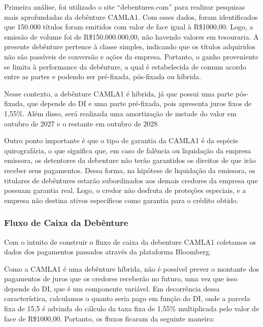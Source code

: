 \documentclass[a4paper,12pt]{article}[abntex2]
\newcommand{\real}[1]{R\$#1}
\begin{document}
Primeira análise, foi utilizado o site “debentures.com”  para realizar pesquisas mais aprofundadas da debênture CAMLA1. Com esses dados, foram identificados que 150.000 títulos foram emitidos com valor de face igual à \real{1000,00}. Logo, a emissão de volume foi de \real{150.000.000,00}, não havendo valores em tesouraria. A presente debênture pertence à classe simples, indicando que os títulos adquiridos não são passíveis de conversão e ações da empresa. Portanto, o ganho proveniente se limita à performance da debênture, a qual é estabelecida de comum acordo entre as partes e podendo ser pré-fixada, pós-fixada ou híbrida.

Nesse contexto, a debênture CAMLA1 é híbrida, já que possui uma parte pós-fixada, que depende do DI e uma parte pré-fixada, pois apresenta juros fixos de 1,55\%. Além disso, será realizada uma amortização de metade do valor em outubro de 2027 e o restante em outubro de 2028.

Outro ponto importante é que o tipo de garantia da CAMLA1 é da espécie quirografária, o que significa que, em caso de falência ou liquidação da empresa emissora, os detentores da debenture não terão garantidos os direitos de que irão receber seus pagamentos. Dessa forma, na hipótese de liquidação da emissora, os titulares de debêntures estarão subordinados aos demais credores da empresa que possuam garantia real. Logo, o credor não desfruta de proteções especiais, e a empresa não destina ativos específicos como garantia para o crédito obtido. 

\subsubsection{\textbf{Fluxo de Caixa da Debênture}}
Com o intuito de construir o fluxo de caixa da debenture CAMLA1 coletamos os dados dos pagamentos passados através da plataforma Bloomberg.

Como a CAMLA1 é uma debênture híbrida, não é possível prever o montante dos pagamentos de juros que os credores receberão no futuro, uma vez que isso depende do DI, que é um componente variável. Em decorrência dessa característica, calculamos o quanto seria pago em função do DI, onde a parcela fixa  de 15,5 é advinda do cálculo da taxa fixa de 1,55\% multiplicada pelo valor de face de \real{1000,00}. Portanto, os fluxos ficaram da seguinte maneira:
\end{document}
